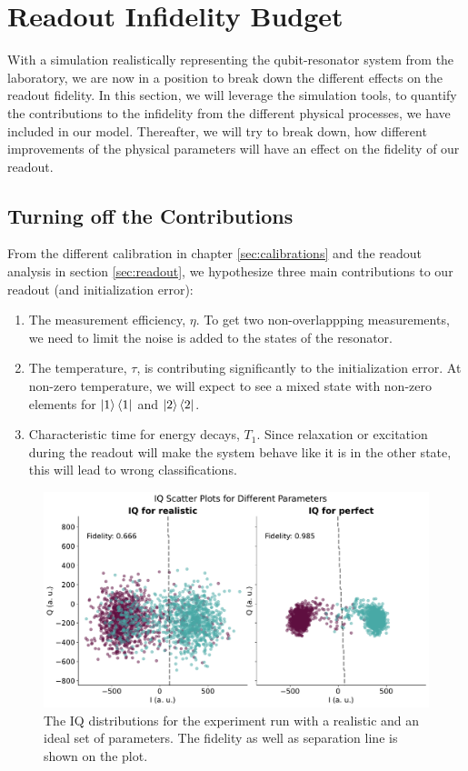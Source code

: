 \chapter{Readout Infidelity Budget} \label{chap:budget}
With a simulation realistically representing the qubit-resonator system from the laboratory, we are now in a position to break down the different effects on the readout fidelity. In this section, we will leverage the simulation tools, to quantify the contributions to the infidelity from the different physical processes, we have included in our model. Thereafter, we will try to break down, how different improvements of the physical parameters will have an effect on the fidelity of our readout. 

\section{Turning off the Contributions}
From the different calibration in chapter \ref{sec:calibrations} and the readout analysis in section \ref{sec:readout}, we hypothesize three main contributions to our readout (and initialization error):
\begin{enumerate}
    \item The measurement efficiency, $\eta$. To get two non-overlappping measurements, we need to limit the noise is added to the states of the resonator. 
    \item The temperature, $\tau$, is contributing significantly to the initialization error. At non-zero temperature, we will expect to see a mixed state with non-zero elements for $\ket{1}\bra{1}$ and $\ket{2}\bra{2}$. 
    \item Characteristic time for energy decays, $T_1$. Since relaxation or excitation during the readout will make the system behave like it is in the other state, this will lead to wrong classifications.
\end{enumerate}


\begin{figure}
    \centering
    \includegraphics[]{Simulations/budgets/figures/iq_scatter_budgetting_on_off_two.pdf}
    \caption{The IQ distributions for the experiment run with a realistic and an ideal set of parameters. The fidelity as well as separation line is shown on the plot. }
    \label{fig:realistic_perfect_comparison}
\end{figure}

